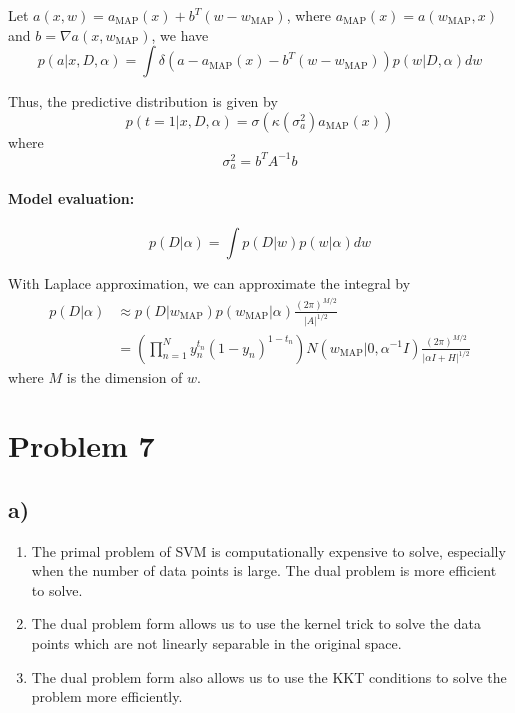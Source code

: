 \documentclass[a4paper,12pt]{article}
\begin{document}
Let $a(x, w) = a_{\text{MAP}}(x) + b^T(w - w_{\text{MAP}})$, where $a_{\text{MAP}}(x) = a(w_{\text{MAP}}, x)$ and $b = \nabla a(x, w_{\text{MAP}})$, we have
\begin{equation*}
	p(a|x, D, \alpha) = \int \delta(a - a_{\text{MAP}}(x) - b^T(w - w_{\text{MAP}})) p(w|D, \alpha) dw
\end{equation*}

Thus, the predictive distribution is given by
\begin{equation*}
	p(t=1|x, D, \alpha) = \sigma(\kappa(\sigma_a^2) a_{\text{MAP}}(x))
\end{equation*}
where
\begin{equation*}
	\sigma_a^2 = b^T A^{-1} b
\end{equation*}

\paragraph{Model evaluation:}
\begin{equation*}
	p(D|\alpha) = \int p(D|w) p(w|\alpha) dw
\end{equation*}

With Laplace approximation, we can approximate the integral by
\begin{align*}
	p(D|\alpha) &\approx p(D|w_\text{MAP}) p(w_\text{MAP}|\alpha) \frac{(2\pi)^{M/2}}{|A|^{1/2}} \\
	&= \left( \prod_{n=1}^{N} y_n^{t_n} (1 - y_n)^{1 - t_n} \right) N(w_\text{MAP}|0, \alpha^{-1} I) \frac{(2\pi)^{M/2}}{|\alpha I + H|^{1/2}}
\end{align*}
where $M$ is the dimension of $w$.

\section*{Problem 7}

\subsection*{a)}

\begin{enumerate}
	\item The primal problem of SVM is computationally expensive to solve, especially when the number of data points is large. The dual problem is more efficient to solve.
	\item The dual problem form allows us to use the kernel trick to solve the data points which are not linearly separable in the original space.
	\item The dual problem form also allows us to use the KKT conditions to solve the problem more efficiently.
\end{enumerate}
\end{document}
